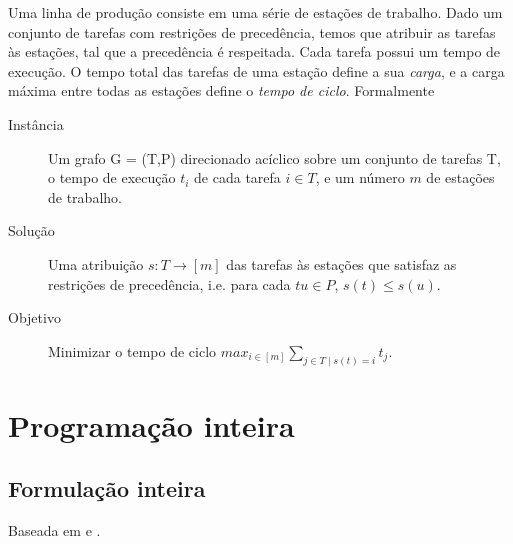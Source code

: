 \documentclass{report}
\begin{document}
Uma linha de produção consiste em uma série de estações de trabalho.
Dado um conjunto de tarefas com restrições de
precedência, temos que atribuir as tarefas às estações, tal que a precedência
é respeitada. Cada tarefa possui um tempo
de execução. O tempo total das tarefas de uma estação define a sua
\emph{carga}, e a carga máxima entre todas as
estações define o \emph{tempo de ciclo}. Formalmente

\begin{description}
 \item [Instância] Um grafo G = (T,P) direcionado acíclico sobre um conjunto de
 tarefas T, o tempo de execução $t_i$ de
cada tarefa $i \in T$, e um número $m$ de estações de trabalho.

 \item [Solução] Uma atribuição $s : T \rightarrow [m]$ das tarefas às
 estações que satisfaz as restrições de
precedência, i.e. para cada $tu \in P$, $s(t) \leq s(u)$.

 \item [Objetivo] Minimizar o tempo de ciclo  $max_{i\in[m]}\sum_{j\in T\mid s(t)=i}t_j$.
\end{description}

\chapter{Programação inteira}

\section{Formulação inteira}

Baseada em \cite{inteiro1} e \cite{inteiro2}.
\end{document}
